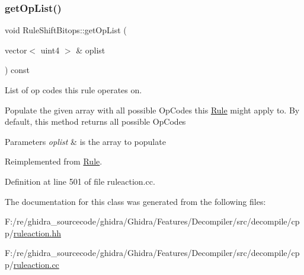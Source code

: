 \subsubsection{\texorpdfstring{getOpList()}{getOpList()}}
{\footnotesize\ttfamily void Rule\+Shift\+Bitops\+::get\+Op\+List (\begin{DoxyParamCaption}\item[{vector$<$ uint4 $>$ \&}]{oplist }\end{DoxyParamCaption}) const\hspace{0.3cm}{\ttfamily [virtual]}}



List of op codes this rule operates on. 

Populate the given array with all possible Op\+Codes this \mbox{\hyperlink{class_rule}{Rule}} might apply to. By default, this method returns all possible Op\+Codes 
\begin{DoxyParams}{Parameters}
{\em oplist} & is the array to populate \\
\hline
\end{DoxyParams}


Reimplemented from \mbox{\hyperlink{class_rule_a4023bfc7825de0ab866790551856d10e}{Rule}}.



Definition at line 501 of file ruleaction.\+cc.



The documentation for this class was generated from the following files\+:\begin{DoxyCompactItemize}
\item 
F\+:/re/ghidra\+\_\+sourcecode/ghidra/\+Ghidra/\+Features/\+Decompiler/src/decompile/cpp/\mbox{\hyperlink{ruleaction_8hh}{ruleaction.\+hh}}\item 
F\+:/re/ghidra\+\_\+sourcecode/ghidra/\+Ghidra/\+Features/\+Decompiler/src/decompile/cpp/\mbox{\hyperlink{ruleaction_8cc}{ruleaction.\+cc}}\end{DoxyCompactItemize}

